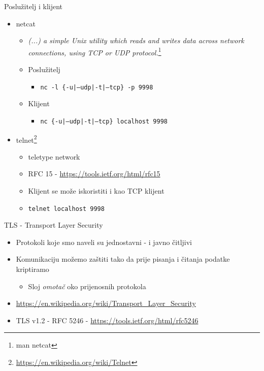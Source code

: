 \documentclass[t]{beamer}
\begin{document}
\begin{frame}{Poslužitelj i klijent}
    \begin{itemize}
        \item netcat
        \begin{itemize}
            \item \textit{(...) a simple Unix utility which reads and writes data across network connections, using TCP or UDP protocol.}\footnote{man netcat}
            \item Poslužitelj
            \begin{itemize}
                \item \texttt{nc -l \{-u|--udp|-t|--tcp\} -p 9998}
            \end{itemize}
            \item Klijent
            \begin{itemize}
                \item \texttt{nc \{-u|--udp|-t|--tcp\} localhost 9998}
            \end{itemize}
        \end{itemize}
        \item telnet\footnote{\url{https://en.wikipedia.org/wiki/Telnet}}
        \begin{itemize}
            \item teletype network
            \item RFC 15 - \url{https://tools.ietf.org/html/rfc15}
            \item Klijent se može iskoristiti i kao TCP klijent
            \item \texttt{telnet localhost 9998}
        \end{itemize}
    \end{itemize}
\end{frame}

\begin{frame}{TLS - Transport Layer Security}
    \begin{itemize}
        \item Protokoli koje smo naveli su jednostavni - i javno čitljivi
        \item Komunikaciju možemo zaštiti tako da prije pisanja i čitanja podatke kriptiramo
        \begin{itemize}
            \item Sloj \textit{omotač} oko prijenosnih protokola
        \end{itemize}
        \item \url{https://en.wikipedia.org/wiki/Transport_Layer_Security}
        \item TLS v1.2 - RFC 5246 - \url{https://tools.ietf.org/html/rfc5246}
    \end{itemize}
\end{frame}
\end{document}
